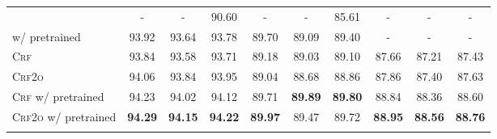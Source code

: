 \begin{table*}[tb]
\begin{tabularx}{\textwidth}{lccccccccc}
        \cite{vilares-etal-2019-better}                 & -                        & -                          & 90.60                    & -                        & -                        & 85.61                    & -              & -              & -              \\
        \cite{zhou-zhao-2019-head} w/ pretrained        & 93.92                    & 93.64                      & 93.78                    & 89.70                    & 89.09                    & 89.40                    & -              & -              & -              \\[3pt]
        \textsc{Crf}                                    & 93.84                    & 93.58                      & 93.71                    & 89.18                    & 89.03                    & 89.10                    & 87.66          & 87.21          & 87.43          \\
        \textsc{Crf2o}                                  & 94.06                    & 93.84                      & 93.95                    & 89.04                    & 88.68                    & 88.86                    & 87.86          & 87.40          & 87.63          \\
        \textsc{Crf} w/ pretrained                      & 94.23                    & 94.02                      & 94.12                    & 89.71                    & \textbf{89.89}           & \textbf{89.80}           & 88.84          & 88.36          & 88.60          \\
        \textsc{Crf2o} w/ pretrained                    & \textbf{94.29}           & \textbf{94.15}             & \textbf{94.22}           & \textbf{89.97}           & 89.47                    & 89.72                    & \textbf{88.95} & \textbf{88.56} & \textbf{88.76} \\[1pt]
        \hline
        \\[-8pt]


\end{tabularx}
\end{table*}
